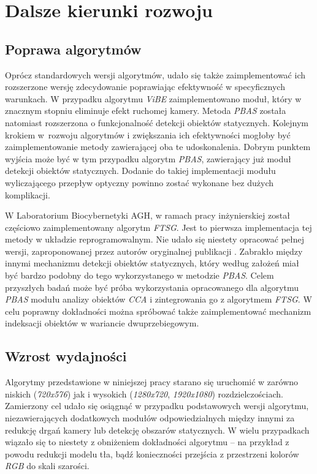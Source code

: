 \chapter{Dalsze kierunki rozwoju}
\label{cha:kierunki_rozwoju}

\section{Poprawa algorytmów}
\label{sec:poprawa_algorytmow}

Oprócz standardowych wersji algorytmów, udało się także zaimplementować ich rozszerzone wersję zdecydowanie poprawiając efektywność w specyficznych warunkach. W przypadku algorytmu \textit{ViBE} zaimplementowano moduł, który w znacznym stopniu eliminuje efekt ruchomej kamery. Metoda \textit{PBAS} została natomiast rozszerzona o funkcjonalność detekcji obiektów statycznych. Kolejnym krokiem w~rozwoju algorytmów i zwiększania ich efektywności mogłoby być zaimplementowanie metody zawierającej oba te udoskonalenia. Dobrym punktem wyjścia może być w tym przypadku algorytm \textit{PBAS}, zawierający już moduł detekcji obiektów statycznych. Dodanie do takiej implementacji modułu wyliczającego przepływ optyczny powinno zostać wykonane bez dużych komplikacji. 

W Laboratorium Biocybernetyki AGH, w ramach pracy inżynierskiej \cite{janus_15} został częściowo zaimplementowany algorytm \textit{FTSG}. 
Jest to pierwsza implementacja tej metody w układzie reprogramowalnym. 
Nie udało się niestety opracować pełnej wersji, zaproponowanej przez autorów oryginalnej publikacji \cite{wang_14}. 
Zabrakło między innymi mechanizmu detekcji obiektów statycznych, który według założeń miał być bardzo podobny do tego wykorzystanego w metodzie \textit{PBAS}. 
Celem przyszłych badań może być próba wykorzystania opracowanego dla algorytmu \textit{PBAS} modułu analizy obiektów \textit{CCA} i zintegrowania go z algorytmem \textit{FTSG}. 
W celu poprawny dokładności można spróbować także zaimplementować mechanizm indeksacji obiektów w wariancie dwuprzebiegowym.

\section{Wzrost wydajności}
\label{sec:wzrost_wydajnosci}

Algorytmy przedstawione w niniejszej pracy starano się uruchomić w zarówno niskich (\textit{720x576}) jak i wysokich (\textit{1280x720}, \textit{1920x1080}) rozdzielczościach. 
Zamierzony cel udało się osiągnąć w przypadku podstawowych wersji algorytmu, niezawierających dodatkowych modułów odpowiedzialnych między innymi za redukcję drgań kamery lub detekcję obszarów statycznych. 
W wielu przypadkach wiązało się to niestety z obniżeniem dokładności algorytmu -- na przykład z powodu redukcji modelu tła, bądź konieczności przejścia z przestrzeni kolorów \textit{RGB} do skali szarości. 

